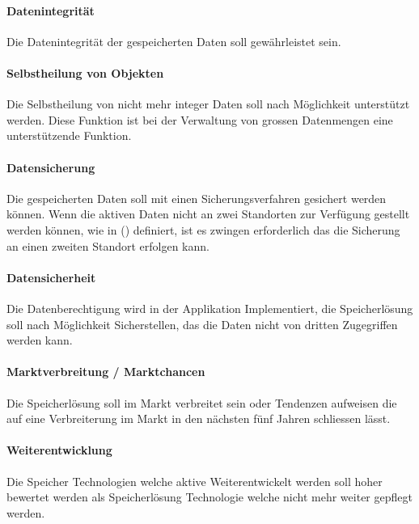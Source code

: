 \setcounter{paragraph}{0}
\renewcommand\theparagraph{Soll-5-\arabic{paragraph}}

\paragraph{Datenintegrität}\label{Soll-5-1}
Die Datenintegrität der gespeicherten Daten soll gewährleistet sein.

\paragraph{Selbstheilung von Objekten}\label{Soll-5-2}
Die Selbstheilung von nicht mehr integer Daten soll nach Möglichkeit unterstützt werden. Diese Funktion ist bei der Verwaltung von grossen Datenmengen eine unterstützende Funktion.

\paragraph{Datensicherung}\label{Soll-5-3}
Die gespeicherten Daten soll mit einen Sicherungsverfahren gesichert werden können. Wenn die aktiven Daten nicht an zwei Standorten zur Verfügung gestellt werden können, wie in () definiert, ist es zwingen erforderlich das die Sicherung an einen zweiten Standort erfolgen kann.

\paragraph{Datensicherheit}\label{Soll-5-4}
Die Datenberechtigung wird in der Applikation Implementiert, die Speicherlösung soll nach Möglichkeit Sicherstellen, das die Daten nicht von dritten Zugegriffen werden kann.

\setcounter{paragraph}{0}
\renewcommand\theparagraph{Soll-6-\arabic{paragraph}}

\paragraph{Marktverbreitung / Marktchancen}\label{Soll-6-1}
Die Speicherlösung soll im Markt verbreitet sein oder Tendenzen aufweisen die auf eine Verbreiterung im Markt in den nächsten fünf Jahren schliessen lässt.

\paragraph{Weiterentwicklung}\label{Soll-6-2}
Die Speicher Technologien welche aktive Weiterentwickelt werden soll hoher bewertet werden als Speicherlösung Technologie welche nicht mehr weiter gepflegt werden.

